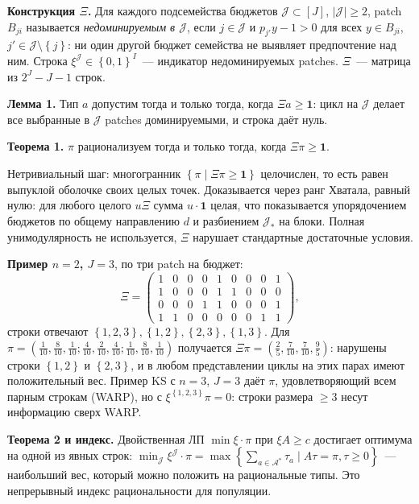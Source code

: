 \documentclass[a4paper,11pt]{article}
\theoremstyle{plain}
\theoremstyle{definition}
\theoremstyle{remark}
\newcommand{\set}[1]{\left\{ #1 \right\}}
\begin{document}
\textbf{Конструкция $\Xi$.} Для каждого подсемейства бюджетов $\mathcal J\subset[J]$, $|\mathcal J|\ge2$, patch $B_{ji}$ называется \textit{недоминируемым в $\mathcal J$}, если $j\in\mathcal J$ и $p_{j'}y-1>0$ для всех $y\in B_{ji}$, $j'\in\mathcal J\setminus\set j$: ни один другой бюджет семейства не выявляет предпочтение над ним. Строка $\xi^{\mathcal J}\in\set{0,1}^I$~--- индикатор недоминируемых patches. $\Xi$~--- матрица из $2^J-J-1$ строк.

\textbf{Лемма 1.} Тип $a$ допустим тогда и только тогда, когда $\Xi a\ge\mathbf 1$: цикл на $\mathcal J$ делает все выбранные в $\mathcal J$ patches доминируемыми, и строка даёт нуль.

\textbf{Теорема 1.} $\pi$ рационализуем тогда и только тогда, когда $\Xi\pi\ge\mathbf 1$.

Нетривиальный шаг: многогранник $\set{\pi\mid\Xi\pi\ge\mathbf 1}$ целочислен, то есть равен выпуклой оболочке своих целых точек. Доказывается через ранг Хватала, равный нулю: для любого целого $u\Xi$ сумма $u\cdot\mathbf 1$ целая, что показывается упорядочением бюджетов по общему направлению $d$ и разбиением $\mathcal J_{\!*}$ на блоки. Полная унимодулярность не используется, $\Xi$ нарушает стандартные достаточные условия.

\textbf{Пример $n=2$, $J=3$}, по три patch на бюджет:
\[
    \Xi=\begin{pmatrix}1&0&0&0&1&0&0&0&1\\1&0&0&0&1&1&0&0&0\\0&0&0&1&1&0&0&0&1\\1&1&0&0&0&0&0&1&1\end{pmatrix}\!,
\]
строки отвечают $\set{1,2,3},\set{1,2},\set{2,3},\set{1,3}$. Для $\pi=(\frac1{10},\frac8{10},\frac1{10};\frac4{10},\frac2{10},\frac4{10};\frac1{10},\frac8{10},\frac1{10})$ получается $\Xi\pi=(\frac25,\frac7{10},\frac7{10},\frac95)$: нарушены строки $\set{1,2}$ и $\set{2,3}$, и в любом представлении циклы на этих парах имеют положительный вес. Пример KS с $n=3$, $J=3$ даёт $\pi$, удовлетворяющий всем парным строкам (WARP), но с $\xi^{\set{1,2,3}}\pi=0$: строки размера $\ge3$ несут информацию сверх WARP.

\textbf{Теорема 2 и индекс.} Двойственная ЛП $\min\xi\cdot\pi$ при $\xi A\ge c$ достигает оптимума на одной из явных строк: $\min_{\mathcal J}\xi^{\mathcal J}\cdot\pi=\max\set{\sum_{a\in\mathcal A^*}\tau_a\mid A\tau=\pi,\tau\ge0}$~--- наибольший вес, который можно положить на рациональные типы. Это непрерывный индекс рациональности для популяции.
\end{document}

